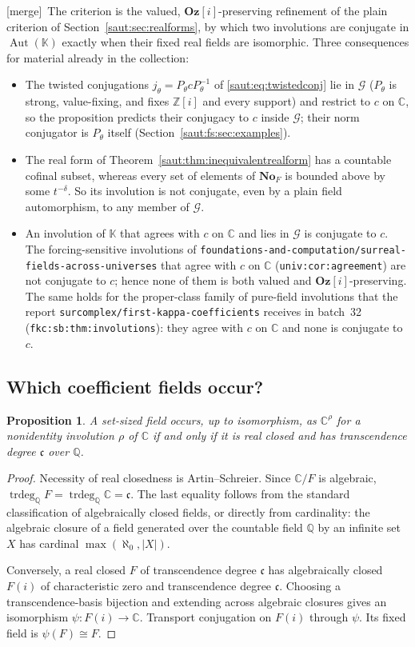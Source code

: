 \documentclass[11pt]{article}
\newtheorem{proposition}[theorem]{Proposition}
\theoremstyle{definition}
\theoremstyle{remark}
\newcommand{\No}{\mathbf{No}}
\newcommand{\C}{\mathbb C}
\newcommand{\Q}{\mathbb Q}
\newcommand{\Z}{\mathbb Z}
\newcommand{\K}{\mathbb K}
\newcommand{\Aut}{\operatorname{Aut}}
\newcommand{\repo}[1]{\nolinkurl{#1}}%
\newcommand{\lbl}[1]{\nolinkurl{#1}}%
\newcommand{\Oz}{\mathbf{Oz}}
\newcommand{\trdeg}{\operatorname{trdeg}}
\newcommand{\cc}{\mathfrak c}
\newcommand{\mergetag}{\textup{[merge]}}
\numberwithin{equation}{section}
\begin{document}
\mergetag\ The criterion is the valued, $\Oz[i]$-preserving refinement of the plain
criterion of Section~\ref{saut:sec:realforms}, by which two involutions are conjugate
in $\Aut(\K)$ exactly when their fixed real fields are isomorphic. Three consequences
for material already in the collection:
\begin{itemize}
\item The twisted conjugations $j_\theta=P_\theta cP_\theta^{-1}$ of
\eqref{saut:eq:twistedconj} lie in $\mathcal G$ ($P_\theta$ is strong,
value-fixing, and fixes $\Z[i]$ and every support) and restrict to $c$ on $\C$, so the
proposition predicts their conjugacy to $c$ inside $\mathcal G$; their norm conjugator
is $P_\theta$ itself (Section~\ref{saut:fs:sec:examples}).
\item The real form of Theorem~\ref{saut:thm:inequivalentrealform} has a countable
cofinal subset, whereas every set of elements of $\No_F$ is bounded above by some
$t^{-\delta}$. So its involution is not conjugate, even by a plain field automorphism,
to any member of $\mathcal G$.
\item An involution of $\K$ that agrees with $c$ on $\C$ and lies in $\mathcal G$ is
conjugate to $c$. The forcing-sensitive involutions of
\repo{foundations-and-computation/surreal-fields-across-universes} that agree with
$c$ on $\C$ (\lbl{univ:cor:agreement}) are not conjugate to $c$; hence none of them is
both valued and $\Oz[i]$-preserving. The same holds for the proper-class family of
pure-field involutions that the report \repo{surcomplex/first-kappa-coefficients}
receives in batch~32 (\lbl{fkc:sb:thm:involutions}): they agree with $c$ on
$\C$ and none is conjugate to $c$.
\end{itemize}

\subsection{Which coefficient fields occur?}

\begin{proposition}\label{saut:fs:prop:which-F}
A set-sized field occurs, up to isomorphism, as $\C^\rho$ for a nonidentity
involution $\rho$ of $\C$ if and only if it is real closed and has transcendence
degree $\cc$ over $\Q$.
\end{proposition}
\begin{proof}
Necessity of real closedness is Artin--Schreier. Since $\C/F$ is algebraic,
$\trdeg_\Q F=\trdeg_\Q\C=\cc$. The last equality follows from the standard
classification of algebraically closed fields, or directly from cardinality: the
algebraic closure of a field generated over the countable field $\Q$ by an infinite
set $X$ has cardinal $\max(\aleph_0,|X|)$.

Conversely, a real closed $F$ of transcendence degree $\cc$ has algebraically closed
$F(i)$ of characteristic zero and transcendence degree $\cc$. Choosing a
transcendence-basis bijection and extending across algebraic closures gives an
isomorphism $\psi:F(i)\to\C$. Transport conjugation on $F(i)$ through $\psi$. Its
fixed field is $\psi(F)\cong F$.
\end{proof}
\end{document}
